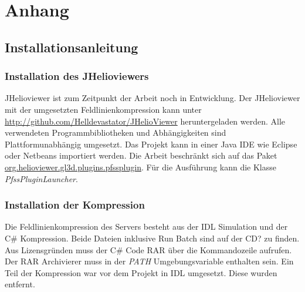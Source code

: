 \section{Anhang}
\subsection{Installationsanleitung}
\subsubsection*{Installation des JHelioviewers}
JHelioviewer ist zum Zeitpunkt der Arbeit noch in Entwicklung.
Der JHelioviewer mit der umgesetzten Feldlinienkompression kann unter \url{http://github.com/Helldevastator/JHelioViewer} heruntergeladen werden. Alle verwendeten Programmbibliotheken und Abhängigkeiten sind Plattformunabhängig umgesetzt. Das Projekt kann in einer Java IDE wie Eclipse oder Netbeans importiert werden. Die Arbeit beschränkt sich auf das Paket \url{org.helioviewer.gl3d.plugins.pfssplugin}. Für die Ausführung kann die Klasse \textit{PfssPluginLauncher}.

\subsubsection*{Installation der Kompression}
Die Feldlinienkompression des Servers besteht aus der IDL Simulation und der C\# Kompression. Beide Dateien inklusive Run Batch sind auf der CD? zu finden. Aus Lizensgründen muss der C\# Code RAR über die Kommandozeile aufrufen. Der RAR Archivierer muss in der \textit{PATH} Umgebungsvariable enthalten sein. Ein Teil der Kompression war vor dem Projekt in IDL umgesetzt. Diese wurden entfernt.
\pagebreak

